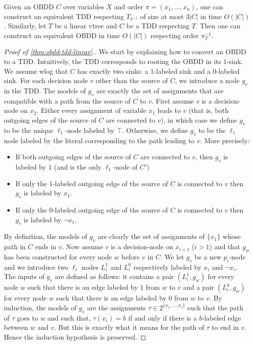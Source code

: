 \documentclass[a4paper,UKenglish,cleveref, autoref, thm-restate]{lipics-v2021}
\newcommand{\guy}[1]{\todo[color=purple]{\color{white}{{\bf Guy}: #1}}}
\begin{document}
\begin{theorem}[$\star$]
  \label{thm:obdd-tdd-linear}
  Given an OBDD $C$ over variables $X$ and order $\pi = (x_1,\dots,x_n)$, one can construct an equivalent
  TDD respecting $T_{\pi^{-1}}$ of size at most $3|C|$ in time $O(|C|)$.
%
  Similarly, let $T$ be a linear vtree and $C$ be a TDD respecting $T$. Then one can construct an equivalent OBDD in time $O(|C|)$ respecting order $\pi_T^{-1}$. 
\end{theorem}
\begin{toappendix}
\begin{proof}[Proof of \cref{thm:obdd-tdd-linear}.]
We start by explaining how to convert an OBDD to a TDD. Intuitively, the TDD corresponds to rooting the OBDD in its $1$-sink. We assume wlog that $C$ has exactly two sinks: a $1$-labeled sink and a $0$-labeled sink. For each decision node $v$ other than the source of $C$, we introduce a node $g_v$ in the TDD. The models of $g_v$ are exactly the set of assignments that are compatible with a path from the source of $C$ to $v$.
First assume $v$ is a decision-node on $x_2$. Either every assignment of variable $x_1$ leads to $v$ (that is, both outgoing edges of the source of $C$ are connected to $v$), in which case we define $g_v$ to be the unique $\ell_1$-node labeled by $\top$. Otherwise, we define $g_v$ to be the $\ell_1$ node labeled by the literal corresponding to the path leading to $v$. More precisely:
\begin{itemize}
  \item If both outgoing edges of the source of $C$ are connected to $v$, then $g_v$ is labeled by $1$ (and is the only $\ell_1$-node of $C'$)
\item If only the $1$-labeled outgoing edge of the source of $C$ is connected to $v$ then $g_v$ is labeled by $x_1$. 
\item If only the $0$-labeled outgoing edge of the source of $C$ is connected to $v$ then $g_v$ is labeled by $\neg x_1$.    
\end{itemize}
	
By definition, the models of $g_v$ are clearly the set of assignments of $\{x_1\}$ whose path in $C$ ends in $v$. Now assume $v$ is a decision-node on $x_{i+1}$ ($i>1$) and that $g_w$ has been constructed for every node $w$ before $v$ in $C$. We let $g_v$ be a new $p_i$-node and we introduce two $\ell_i$ nodes $L^1_i$ and $L_i^0$ respectively labeled by $x_i$ and $\neg x_i$. The inputs of $g_v$ are defined as follows: it contains a pair $(L^1_i, g_w)$ for every node $w$ such that there is an edge labeled by $1$ from $w$ to $v$ and a pair $(L_i^0, g_w)$ for every node $w$ such that there is an edge labeled by $0$ from $w$ to $v$. By induction, the models of $g_v$ are the assignments $\tau \in 2^{\{x_1,\dots,x_i\}}$ such that the path of $\tau$ goes to $w$ and such that, $\tau(x_i) = b$ if and only if there is a $b$-labeled edge between $w$ and $v$. But this is exactly what it means for the path of $\tau$ to end in $v$. Hence the induction hypothesis is preserved.
	

\end{proof}
\end{toappendix}
\end{document}
